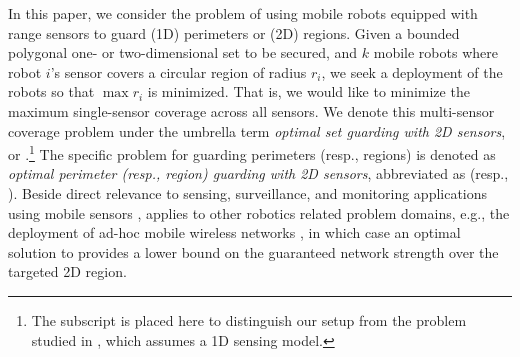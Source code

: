 In this paper, we consider the problem of using mobile robots equipped 
with range sensors to guard (1D) perimeters or (2D) regions. Given 
a bounded polygonal one- or two-dimensional set to be secured, 
and $k$ mobile robots where robot $i$'s sensor covers a circular region of 
radius $r_i$, we seek a deployment of the robots so that $\max r_i$ is 
minimized. That is, we would like to minimize the maximum single-sensor 
coverage across all sensors. We denote this multi-sensor coverage problem 
under the umbrella term {\em optimal set guarding with 2D sensors}, or 
\osgt.\footnote{The subscript is placed here to distinguish our setup 
from the \opg problem studied in \cite{FenHanGaoYuRSS19}, which assumes 
a 1D sensing model.} The specific problem for guarding
perimeters (resp., regions) is denoted as {\em optimal perimeter 
(resp., region) guarding with 2D sensors}, abbreviated as \opgt (resp., 
\orgt). Beside direct relevance to sensing, surveillance, and monitoring 
applications using mobile sensors \cite{batalin2002spreading,
cortes2004coverage,FenHanGaoYuRSS19}, \osgt applies to other robotics
related problem domains, e.g., the deployment of ad-hoc mobile wireless 
networks \cite{correll2009ad,gil2012communication}, in which case an 
optimal solution to \osgt provides a lower bound on the guaranteed network 
strength over the targeted 2D region. 

